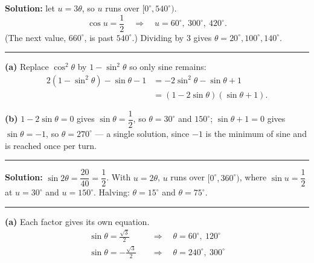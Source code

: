 \documentclass[12pt]{article}
\begin{document}
\textbf{Solution:} let $u = 3\theta$, so $u$ runs over $[0^\circ, 540^\circ)$.
\[ \cos u = \frac{1}{2} \quad\Longrightarrow\quad u = 60^\circ,\ 300^\circ,\ 420^\circ. \]
(The next value, $660^\circ$, is past $540^\circ$.) Dividing by $3$ gives $\theta = 20^\circ, 100^\circ, 140^\circ$. 

\vspace{0.15cm}\noindent\rule{\linewidth}{0.2pt}\vspace{0.15cm}


\textbf{(a)} Replace $\cos^2\theta$ by $1 - \sin^2\theta$ so only sine remains:
\begin{align*}
  2(1 - \sin^2\theta) - \sin\theta - 1 &= -2\sin^2\theta - \sin\theta + 1 \\
  &= (1 - 2\sin\theta)(\sin\theta + 1).
\end{align*}

\textbf{(b)} $1 - 2\sin\theta = 0$ gives $\sin\theta = \dfrac{1}{2}$, so $\theta = 30^\circ$ and $150^\circ$; $\sin\theta + 1 = 0$ gives $\sin\theta = -1$, so $\theta = 270^\circ$ --- a single solution, since $-1$ is the minimum of sine and is reached once per turn. 

\vspace{0.15cm}\noindent\rule{\linewidth}{0.2pt}\vspace{0.15cm}


\textbf{Solution:} $\sin 2\theta = \dfrac{20}{40} = \dfrac{1}{2}$. With $u = 2\theta$, $u$ runs over $[0^\circ, 360^\circ)$, where $\sin u = \dfrac{1}{2}$ at $u = 30^\circ$ and $u = 150^\circ$. Halving: $\theta = 15^\circ$ and $\theta = 75^\circ$. 

\vspace{0.15cm}\noindent\rule{\linewidth}{0.2pt}\vspace{0.15cm}


\textbf{(a)} Each factor gives its own equation.
\begin{align*}
  \sin\theta = \frac{\sqrt{3}}{2} \quad&\Longrightarrow\quad \theta = 60^\circ,\ 120^\circ \\
  \sin\theta = -\frac{\sqrt{3}}{2} \quad&\Longrightarrow\quad \theta = 240^\circ,\ 300^\circ
\end{align*}
\end{document}
